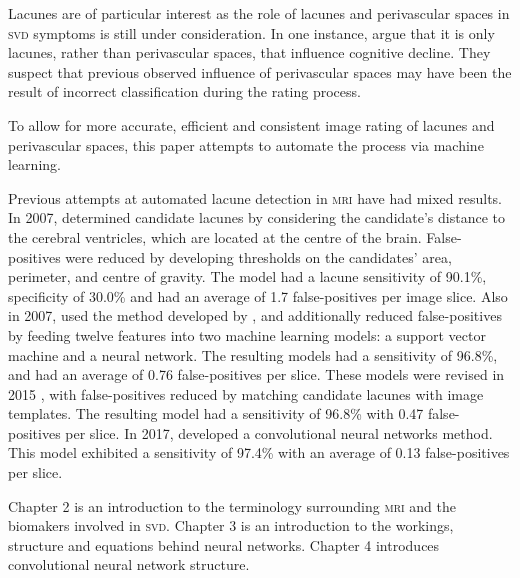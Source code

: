 Lacunes are of particular interest as the role of lacunes and perivascular spaces in \textsc{svd} symptoms is still under consideration. In one instance, \cite{BenjaminJ.Philip2018LIbN} argue that it is only lacunes, rather than perivascular spaces, that influence cognitive decline. They suspect that previous observed influence of perivascular spaces may have been the result of incorrect classification during the rating process.

To allow for more accurate, efficient and consistent image rating of lacunes and perivascular spaces, this paper attempts to automate the process via machine learning.

Previous attempts at automated lacune detection in \textsc{mri} have had mixed results. In 2007, \cite{Yokoyama2007} determined candidate lacunes by considering the candidate's distance to the cerebral ventricles, which are located at the centre of the brain. False-positives were reduced by developing thresholds on the candidates' area, perimeter, and centre of gravity. The model had a lacune sensitivity of 90.1\%, specificity of 30.0\% and had an average of 1.7 false-positives per image slice. Also in 2007, \cite{Uchiyama20071554, Uchiyama2007b} used the method developed by \cite{Yokoyama2007}, and additionally reduced false-positives by feeding twelve features into two machine learning models: a support vector machine and a neural network. The resulting models had a sensitivity of 96.8\%, and had an average of 0.76 false-positives per slice. These models were revised in 2015 \citep{Uchiyama2015}, with false-positives reduced by matching candidate lacunes with image templates. The resulting model had a sensitivity of 96.8\% with 0.47 false-positives per slice. In 2017, \cite{GhafoorianM.2017Dml3} developed a convolutional neural networks method. This model exhibited a sensitivity of 97.4\% with an average of 0.13 false-positives per slice.

Chapter 2 is an introduction to the terminology surrounding \textsc{mri} and the biomakers involved in \textsc{svd}. Chapter 3 is an introduction to the workings, structure and equations behind neural networks. Chapter 4 introduces convolutional neural network structure.

%
%
%






